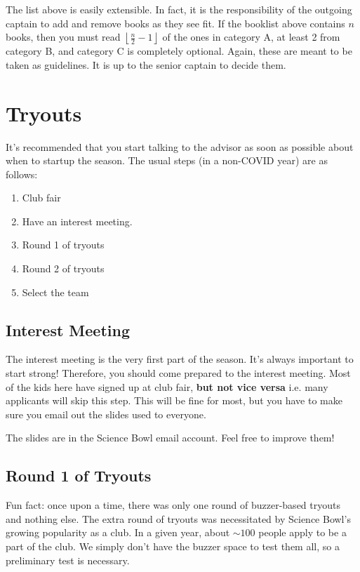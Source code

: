 \documentclass[11pt, letterpaper]{article}
\begin{document}
The list above is easily extensible. 
In fact, it is the responsibility of the outgoing captain to add and remove books as they see fit.
If the booklist above contains $n$ books, then you must read $\left \lfloor \frac{n}{2} - 1 \right \rfloor $ of the ones in category A, at least 2 from category B, and category C is completely optional.
Again, these are meant to be taken as guidelines.
It is up to the senior captain to decide them.

\newpage

\section{Tryouts}

It's recommended that you start talking to the advisor as soon as possible about when to startup the season.
The usual steps (in a non-COVID year) are as follows:

\begin{enumerate}
    \item Club fair
    \item Have an interest meeting.
    \item Round 1 of tryouts
    \item Round 2 of tryouts
    \item Select the team
\end{enumerate}

\subsection{Interest Meeting}

The interest meeting is the very first part of the season.
It's always important to start strong!
Therefore, you should come prepared to the interest meeting.
Most of the kids here have signed up at club fair, \textbf{but not vice versa} i.e. many applicants will skip this step.
This will be fine for most, but you have to make sure you email out the slides used to everyone.

\noindent
The slides are in the Science Bowl email account.
Feel free to improve them!

\subsection{Round 1 of Tryouts}

Fun fact: once upon a time, there was only one round of buzzer-based tryouts and nothing else.
The extra round of tryouts was necessitated by Science Bowl's growing popularity as a club.
In a given year, about $\sim 100$ people apply to be a part of the club.
We simply don't have the buzzer space to test them all, so a preliminary test is necessary.
\end{document}
